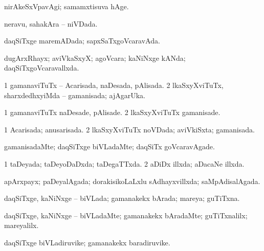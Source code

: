 {{\bentry
{} 
\gl{\kirxvi}
\expl{}
\bmng
nirAkeSxVpavAgi; samamxtisuva hAge. 
\emng
\eentry

\bentry
{} 
\gl{\gu}
\expl{}
\bmng
neravu, sahakAra -- niVDada. 
\emng
\eentry

\bentry
{} 
\gl{\gu}
\expl{}
\bmng
daqSiTxge maremADada; sapxSaTxgoVcaravAda. 
\emng
\eentry

\bentry
{} 
\gl{\gu}
\expl{}
\bmng
dugArxRhayx; aviVkaSxyX; agoVcara; kaNiNxge kANda; daqSiTxgoVcaravallxda. 
\emng
\eentry

\bentry
{} 
\gl{\gu}
\expl{}
\bmng
\bnum
\num{1} gamanaviTuTx -- Acarisada, naDesada, pAlisada. 
\num{2} lkaSxyXviTuTx, sharxdedhxyiMda -- gamanisada; ajAgarUka. 
\enum
\emng
\eentry

\bentry
{} 
\gl{\kirxvi}
\expl{}
\bmng
\bnum
\num{1} gamanaviTuTx naDesade, pAlisade. 
\num{2} lkaSxyXviTuTx gamanisade. 
\enum
\emng
\eentry

\bentry
{} 
\gl{\gu}
\expl{}
\bmng
\bnum
\num{1} Acarisada; anusarisada. 
\num{2} lkaSxyXviTuTx noVDada; aviVkiSxta; gamanisada. 
\enum
\emng
\eentry

\bentry
{} 
\gl{\kirxvi}
\expl{}
\bmng
gamanisadaMte; daqSiTxge biVLadaMte; daqSiTx goVcaravAgade. 
\emng
\eentry

\bentry
{} 
\gl{\gu}
\expl{}
\bmng
\bnum
\num{1} taDeyada; taDeyoDaDxda; taDegaTTxda. 
\num{2} aDiDx illxda; aDacaNe illxda. 
\enum
\emng
\eentry

\bentry
{} 
\gl{\gu}
\expl{}
\bmng
apArxpayx; paDeyalAgada; dorakisikoLaLxlu sAdhayxvillxda; saMpAdisalAgada. 
\emng
\eentry

\bentry
{} 
\gl{\gu}
\expl{}
\bmng
daqSiTxge, kaNiNxge -- biVLada; gamanakekx bArada; mareya; guTiTxna. 
\emng
\eentry

\bentry
{} 
\gl{\kirxvi}
\expl{}
\bmng
daqSiTxge, kaNiNxge -- biVLadaMte; gamanakekx bAradaMte; guTiTxnalilx; mareyalilx. 
\emng
\eentry

\bentry
{} 
\gl{\nA}
\expl{}
\bmng
daqSiTxge biVLadiruvike; gamanakekx baradiruvike. 
\emng
\eentry

}}
